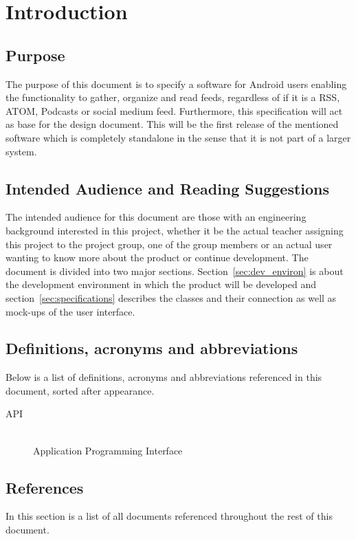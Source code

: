 \section{Introduction}


\subsection{Purpose}
The purpose of this document is to specify a software for Android users enabling the functionality to gather, organize and read feeds, regardless of if it is a RSS\cite{rss-spec}, ATOM\cite{atom}, Podcasts or social medium feed. Furthermore, this specification will act as base for the design document. This will be the first release of the mentioned software which is completely standalone in the sense that it is not part of a larger system.


\subsection{Intended Audience and Reading Suggestions}
The intended audience for this document are those with an engineering background interested in this project, whether it be the actual teacher assigning this project to the project group, one of the group members or an actual user wanting to know more about the product or continue development. The document is divided into two major sections. Section~\ref{sec:dev_environ} is about the development environment in which the product will be developed and section~\ref{sec:specifications} describes the classes and their connection as well as mock-ups of the user interface.


\subsection{Definitions, acronyms and abbreviations}
Below is a list of definitions, acronyms and abbreviations referenced in this document, sorted after appearance.

\begin{description}
  \item[API] \hfill \\
  Application Programming Interface
\end{description}


\subsection{References}
In this section is a list of all documents referenced throughout the rest of this document.


